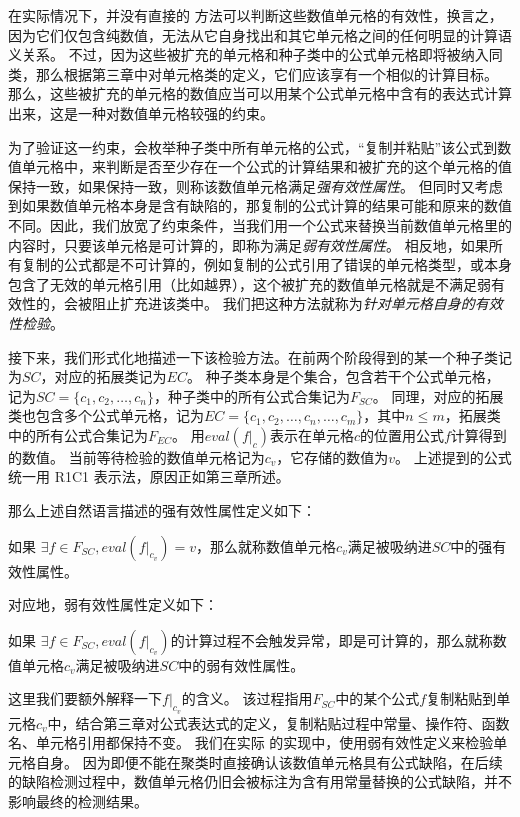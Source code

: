 在实际情况下，并没有直接的 方法可以判断这些数值单元格的有效性，换言之，因为它们仅包含纯数值，无法从它自身找出和其它单元格之间的任何明显的计算语义关系。
不过，因为这些被扩充的单元格和种子类中的公式单元格即将被纳入同类，那么根据第三章中对单元格类的定义，它们应该享有一个相似的计算目标。
那么，这些被扩充的单元格的数值应当可以用某个公式单元格中含有的表达式计算出来，这是一种对数值单元格较强的约束。

为了验证这一约束，\wa 会枚举种子类中所有单元格的公式，“复制并粘贴”该公式到数值单元格中，来判断是否至少存在一个公式的计算结果和被扩充的这个单元格的值保持一致，如果保持一致，则称该数值单元格满足\textit{强有效性属性}。
但同时又考虑到如果数值单元格本身是含有缺陷的，那复制的公式计算的结果可能和原来的数值不同。因此，我们放宽了约束条件，当我们用一个公式来替换当前数值单元格里的内容时，只要该单元格是可计算的，即称为满足\textit{弱有效性属性}。
相反地，如果所有复制的公式都是不可计算的，例如复制的公式引用了错误的单元格类型，或本身包含了无效的单元格引用（比如越界），这个被扩充的数值单元格就是不满足弱有效性的，会被阻止扩充进该类中。
我们把这种方法就称为\textit{针对单元格自身的有效性检验}。

接下来，我们形式化地描述一下该检验方法。在前两个阶段得到的某一个种子类记为$SC$，对应的拓展类记为$EC$。
种子类本身是个集合，包含若干个公式单元格，记为$SC= \{c_{1}, c_{2}, \dots, c_{n}\}$，种子类中的所有公式合集记为$F_{SC}$。
同理，对应的拓展类也包含多个公式单元格，记为$EC=\{c_1, c_2, \dots, c_n, \dots, c_m\}$，其中$n \leq m$，拓展类中的所有公式合集记为$F_{EC}$。
用$eval(f|_c)$表示在单元格$c$的位置用公式$f$计算得到的数值。
当前等待检验的数值单元格记为$c_v$，它存储的数值为$v$。
上述提到的公式统一用 R1C1 表示法，原因正如第三章所述。

那么上述自然语言描述的强有效性属性定义如下：
\begin{definition}
    如果 $\exists f \in F_{SC},  eval(f|_{c_v}) = v$，那么就称数值单元格$c_v$满足被吸纳进$SC$中的强有效性属性。   
\end{definition}

对应地，弱有效性属性定义如下：
\begin{definition}
    如果 $\exists f \in F_{SC}, eval(f|_{c_v})$的计算过程不会触发异常，即是可计算的，那么就称数值单元格$c_v$满足被吸纳进$SC$中的弱有效性属性。
\end{definition}

这里我们要额外解释一下$f|_{c_v}$的含义。
该过程指用$F_{SC}$中的某个公式$f$复制粘贴到单元格$c_v$中，结合第三章对公式表达式的定义，复制粘贴过程中常量、操作符、函数名、单元格引用都保持不变。
我们在实际 \wa 的实现中，使用弱有效性定义来检验单元格自身。
因为即便不能在聚类时直接确认该数值单元格具有公式缺陷，在后续的缺陷检测过程中，数值单元格仍旧会被标注为含有用常量替换的公式缺陷，并不影响最终的检测结果。

